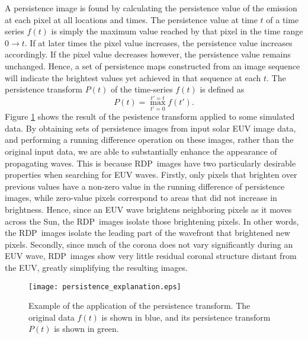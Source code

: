 \documentclass[namedreferences]{solarphysics}
\newcommand{\RDP}{RDP}
\begin{document}
\begin{article}
A persistence image is found by calculating the persistence value of
the emission at each pixel at all locations and times.  The
persistence value at time $t$ of a time series $f(t)$ is simply the
maximum value reached by that pixel in the time range $0\rightarrow
t$.  If at later times the pixel value increases, the persistence
value increases accordingly. If the pixel value decreases however, the
persistence value remains unchanged. Hence, a set of persistence maps
constructed from an image sequence will indicate the brightest values
yet achieved in that sequence at each $t$.  The persistence transform
$P(t)$ of the time-series $f(t)$ is defined as
\begin{equation}
\label{eqn:persisttransform}
P(t) = \max_{t'=0}^{t'=t}f(t').
\end{equation}
Figure \ref{fig:persistence} shows the result of the pesistence
transform applied to some simulated data.  By obtaining sets of
persistence images from input solar EUV image data, and performing a
running difference operation on these images, rather than the original
input data, we are able to substantially enhance the appearance of
propagating waves. This is because \RDP\ images have two particularly
desirable properties when searching for EUV waves.  Firstly, only
pixels that brighten over previous values have a non-zero value in the
running difference of persistence images, while zero-value pixels
correspond to areas that did not increase in brightness. Hence, since
an EUV wave brightens neighboring pixels as it moves across the Sun,
the \RDP\ images isolate those brightening pixels.  In other words,
the \RDP\ images isolate the leading part of the wavefront that
brightened new pixels.  Secondly, since much of the corona does not
vary significantly during an EUV wave, \RDP\ images show very little
residual coronal structure distant from the EUV, greatly simplifying
the resulting images.

\begin{figure}
\begin{center}
\texttt{[image: persistence\_explanation.eps]}
\caption{Example of the application of the persistence transform.  The
original data $f(t)$ is shown in blue, and its persistence transform
$P(t)$ is shown in green.}
\label{fig:persistence}
\end{center}
\end{figure}


\end{article}
\end{document}

